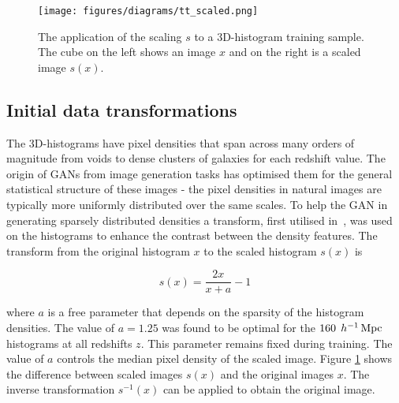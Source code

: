 \documentclass[twocolumn]{article}
\numberwithin{equation}{section}
\begin{document}
\begin{figure}
\texttt{[image: figures/diagrams/tt\_scaled.png]}%
\centering
\caption{The application of the scaling $s$ to a 3D-histogram training sample. The cube on the left shows an 
image $x$ and on the right is a scaled image $s(x)$.}
\label{fig:scaling}
\end{figure}


\subsection{Initial data transformations} 
The 3D-histograms have pixel densities that span across many orders of magnitude from voids to dense clusters of galaxies 
for each redshift value. The origin of GANs from image generation tasks has optimised them for the general statistical 
structure of these images - the pixel densities in natural images are typically more uniformly distributed over the same 
scales. To help the GAN in generating sparsely distributed densities a transform, first utilised in~\cite{web_gan}, was 
used on the histograms to enhance the contrast between the density features. The transform from the original histogram 
$x$ to the scaled histogram $s(x)$ is 

\begin{equation}
    s(x) = \frac{2x}{x+a} - 1
\end{equation}

where $a$ is a free parameter that depends on the sparsity of the histogram densities. The value of $a=1.25$ was found 
to be optimal for the $160 \:  \: h^{-1} \,\textup{Mpc}$ histograms at all redshifts $z$. This parameter remains fixed 
during training. The value of $a$ controls the median pixel density of the scaled image. Figure \ref{fig:scaling} shows 
the difference between scaled images $s(x)$ and the original images $x$. The inverse transformation $s^{-1}(x)$ can be 
applied to obtain the original image. 
\end{document}
